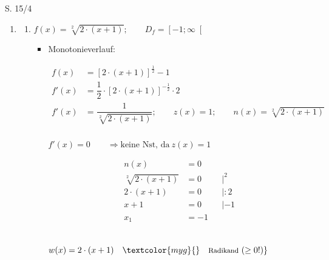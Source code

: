 \begin{Exercise}{S. 15/4}{}
    \begin{enumerate}
        \item [4.]\begin{enumerate}[label=\alph*)]
            \item[c)] {
                $f(x) = \sqrt[2]{2 \cdot (x +1)}; \qquad D_{f} = \left[ -1; \infty \right[$\\[-1.0ex]
                \begin{itemize}[leftmargin=*]
                    \item Monotonieverlauf:\\{
                        \vspace{-2.0ex}
                        \begin{align*}
                            f(x) &= \left[2 \cdot (x +1)\right]^{\frac{1}{2}} -1 && \\[1.5ex]
                            f'(x) &= \dfrac{1}{2} \cdot \left[2 \cdot (x +1)\right]^{-\frac{1}{2}} \cdot 2 && \\[1.5ex]
                            f'(x) &= \dfrac{1}{\sqrt[2]{2 \cdot (x +1)}}; \qquad z(x) = 1; \qquad n(x) = \sqrt[2]{2 \cdot (x +1)} &&
                        \end{align*}\\[1.0ex]
                        $f'(x) = 0 \qquad \Rightarrow \text{keine Nst, da} \ z(x) = 1$ \quad \textcolor{myg}{}\\
                        \begin{minipage}[t]{\linewidth}
                            \begin{align*}
                                n(x) &= 0 && \\[1.0ex]
                                \sqrt[2]{2 \cdot (x +1)} &= 0 &&| ^2\\[1.0ex]
                                2 \cdot (x +1) &= 0 &&| :2\\[1.0ex]
                                x +1 &= 0 &&| -1\\[1.0ex]
                                x_{1} &= -1 &&
                            \end{align*}
                        \end{minipage}\\[2.0ex]
                        $w(x) = 2 \cdot (x + 1) \quad \textcolor{myg}{\text{\}\quad \footnotesize Radikand} \ (\geq 0!)}$\\[2.0ex]
}
\end{itemize}}
\end{enumerate}
\end{enumerate}
\end{Exercise}
